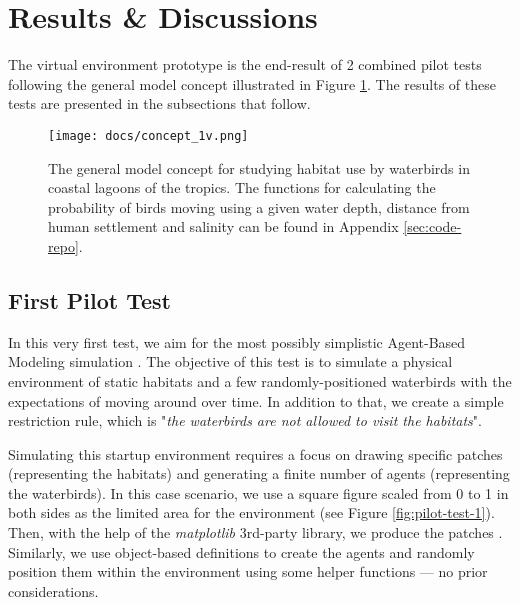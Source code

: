 
\section{Results \& Discussions}
The virtual environment prototype is the end-result of 2 combined pilot tests following the general model concept illustrated in Figure \ref{fig:concept-1v}. The results of these tests are presented in the subsections that follow.

\begin{figure}[h!]
    \centering
    \texttt{[image: docs/concept\_1v.png]}
    \caption{The general model concept for studying habitat use by waterbirds in coastal lagoons of the tropics. The functions for calculating the probability of birds moving using a given water depth, distance from human settlement and salinity can be found in Appendix \ref{sec:code-repo}.}
    \label{fig:concept-1v}
\end{figure}

\subsection{First Pilot Test}
In this very first test, we aim for the most possibly simplistic Agent-Based Modeling simulation \cite{jupyternotebook}. The objective of this test is to simulate a physical environment of static habitats and a few randomly-positioned waterbirds with the expectations of moving around over time. In addition to that, we create a simple restriction rule, which is "\textit{the waterbirds are not allowed to visit the habitats}".

Simulating this startup environment requires a focus on drawing specific patches (representing the habitats) and generating a finite number of agents (representing the waterbirds). In this case scenario, we use a square figure scaled from 0 to 1 in both sides as the limited area for the environment (see Figure \ref{fig:pilot-test-1}). Then, with the help of the \emph{matplotlib} \cite{matplotlib.path,matplotlib.pyplot} 3rd-party library, we produce the patches \cite{matplotlib.patches}. Similarly, we use object-based definitions to create the agents and randomly position them within the environment using some helper functions — no prior considerations.

